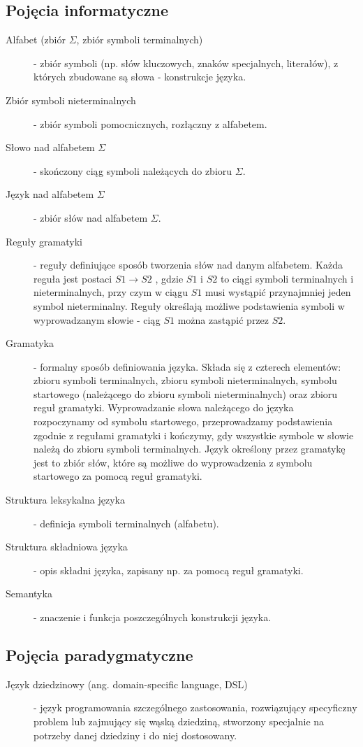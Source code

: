 \subsection{Pojęcia informatyczne}
\begin{description}
 \item[Alfabet (zbiór $\Sigma$, zbiór symboli terminalnych)] - zbiór symboli (np. słów kluczowych, znaków specjalnych, literałów), z których zbudowane są słowa - konstrukcje języka.
 \item[Zbiór symboli nieterminalnych] - zbiór symboli pomocnicznych, rozłączny z alfabetem.
 \item[Słowo nad alfabetem $\Sigma$] - skończony ciąg symboli należących do zbioru $\Sigma $.
 \item[Język nad alfabetem $\Sigma$] - zbiór słów nad alfabetem $\Sigma $.
 \item[Reguły gramatyki] - reguły definiujące sposób tworzenia słów nad danym alfabetem. Każda reguła jest postaci $S1 \rightarrow S2$ , gdzie $S1$ i $S2$ to ciągi symboli terminalnych i nieterminalnych, przy czym w ciągu $S1$ musi wystąpić przynajmniej jeden symbol nieterminalny. Reguły określają możliwe podstawienia symboli w wyprowadzanym słowie - ciąg $S1$ można zastąpić przez $S2$. 
 \item[Gramatyka] - formalny sposób definiowania języka. Składa się z czterech elementów: zbioru symboli terminalnych, zbioru symboli nieterminalnych, symbolu startowego (należącego do zbioru symboli nieterminalnych) oraz zbioru reguł gramatyki. Wyprowadzanie słowa należącego do języka rozpoczynamy od symbolu startowego, przeprowadzamy podstawienia zgodnie z regułami gramatyki i kończymy, gdy wszystkie symbole w słowie należą do zbioru symboli terminalnych. Język określony przez gramatykę jest to zbiór słów, które są możliwe do wyprowadzenia z symbolu startowego za pomocą reguł gramatyki.
 \item[Struktura leksykalna języka] - definicja symboli terminalnych (alfabetu).
 \item[Struktura składniowa języka] - opis składni języka, zapisany np. za pomocą reguł gramatyki.
 \item[Semantyka] - znaczenie i funkcja poszczególnych konstrukcji języka.
 \end{description}
\subsection{Pojęcia paradygmatyczne}
\begin{description}
 \item[Język dziedzinowy (ang. domain-specific language, DSL)] - język programowania szczególnego zastosowania, rozwiązujący specyficzny problem lub zajmujący się wąską dziedziną, stworzony specjalnie na potrzeby danej dziedziny i do niej dostosowany.
 
 \end{description}